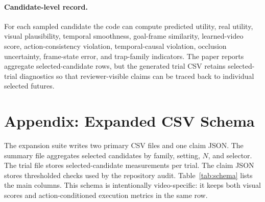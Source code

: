 \documentclass{article}
\begin{document}
\paragraph{Candidate-level record.}
For each sampled candidate the code can compute predicted utility, real utility, visual plausibility, temporal smoothness, goal-frame similarity, learned-video score, action-consistency violation, temporal-causal violation, occlusion uncertainty, frame-state error, and trap-family indicators. The paper reports aggregate selected-candidate rows, but the generated trial CSV retains selected-trial diagnostics so that reviewer-visible claims can be traced back to individual selected futures.

\section{Appendix: Expanded CSV Schema}
\label{app:schema}

The expansion suite writes two primary CSV files and one claim JSON. The summary file aggregates selected candidates by family, setting, \(N\), and selector. The trial file stores selected-candidate measurements per trial. The claim JSON stores thresholded checks used by the repository audit. Table~\ref{tab:schema} lists the main columns. This schema is intentionally video-specific: it keeps both visual scores and action-conditioned execution metrics in the same row.
\end{document}
